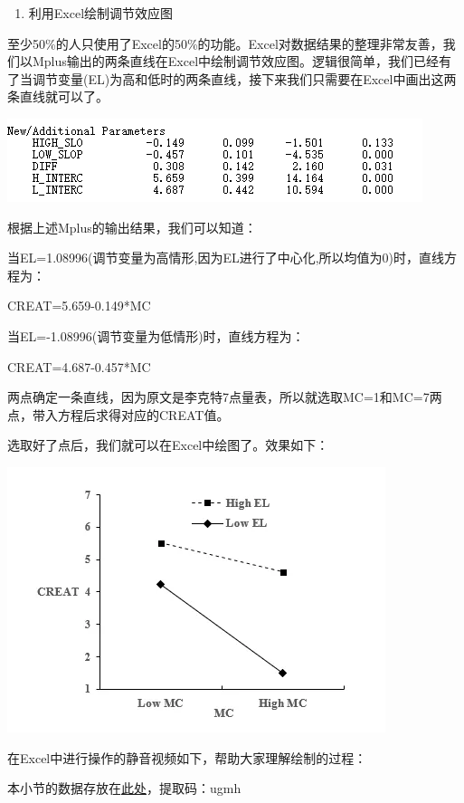 \documentclass[
]{book}
\providecommand{\tightlist}{%
  \setlength{\itemsep}{0pt}\setlength{\parskip}{0pt}}
\begin{document}
\begin{enumerate}
\def\labelenumi{\arabic{enumi}.}
\setcounter{enumi}{3}
\tightlist
\item
  利用Excel绘制调节效应图
\end{enumerate}

至少50\%的人只使用了Excel的50\%的功能。Excel对数据结果的整理非常友善，我们以Mplus输出的两条直线在Excel中绘制调节效应图。逻辑很简单，我们已经有了当调节变量(EL)为高和低时的两条直线，接下来我们只需要在Excel中画出这两条直线就可以了。

\includegraphics{figs/13114.png}

根据上述Mplus的输出结果，我们可以知道：

当EL=1.08996(调节变量为高情形,因为EL进行了中心化,所以均值为0)时，直线方程为：

CREAT=5.659-0.149*MC

当EL=-1.08996(调节变量为低情形)时，直线方程为：

CREAT=4.687-0.457*MC

两点确定一条直线，因为原文是李克特7点量表，所以就选取MC=1和MC=7两点，带入方程后求得对应的CREAT值。

选取好了点后，我们就可以在Excel中绘图了。效果如下：

\includegraphics{figs/13115.png}

在Excel中进行操作的静音视频如下，帮助大家理解绘制的过程：

本小节的数据存放在\href{https://pan.baidu.com/s/1gxaa4SfN4IKnMy3bydmuXQ}{此处}，提取码：ugmh
\end{document}
